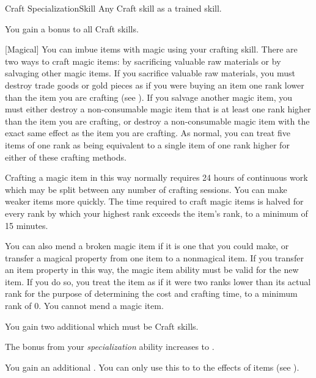     \begin{feat}{Craft Specialization}{Skill}
        \featpre Any Craft skill as a trained skill.

         You gain a  bonus to all Craft skills.

        [Magical] You can imbue items with magic using your crafting skill.
        There are two ways to craft magic items: by sacrificing valuable raw materials or by salvaging other magic items.
        If you sacrifice valuable raw materials, you must destroy trade goods or gold pieces as if you were buying an item one rank lower than the item you are crafting  (see ).
        If you salvage another magic item, you must either destroy a non-consumable magic item that is at least one rank higher than the item you are crafting, or destroy a non-consumable magic item with the exact same effect as the item you are crafting.
        As normal, you can treat five items of one rank as being equivalent to a single item of one rank higher for either of these crafting methods.

        Crafting a magic item in this way normally requires 24 hours of continuous work which may be split between any number of crafting sessions.
        You can make weaker items more quickly.
        The time required to craft magic items is halved for every rank by which your highest rank exceeds the item's rank, to a minimum of 15 minutes.

        You can also mend a broken magic item if it is one that you could make, or transfer a magical property from one item to a nonmagical item.
        If you transfer an item property in this way, the magic item ability must be valid for the new item.
        If you do so, you treat the item as if it were two ranks lower than its actual rank for the purpose of determining the cost and crafting time, to a minimum rank of 0.
        You cannot mend a  magic item.

         You gain two additional  which must be Craft skills.

         The bonus from your \textit{specialization} ability increases to .

         You gain an additional .
        You can only use this  to  to the effects of items (see ).
    \end{feat}

